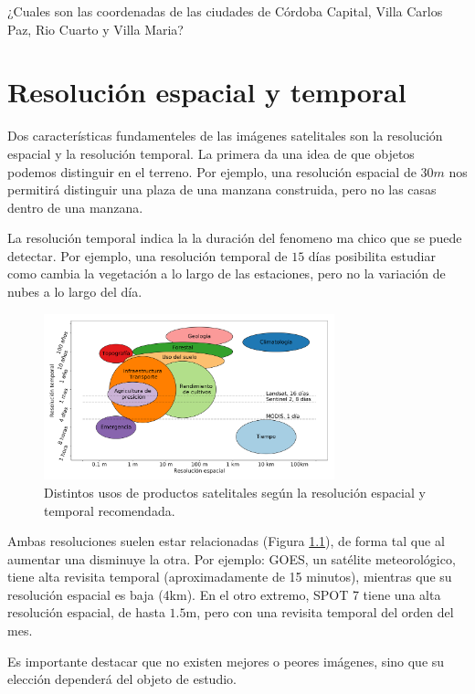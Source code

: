 \documentclass[a4paper,12pt]{book}
\begin{document}
\begin{que}
    ¿Cuales son las coordenadas de las ciudades de Córdoba Capital, Villa Carlos Paz, Rio Cuarto y Villa Maria?
\end{que}




\chapter{Resolución espacial y temporal}
Dos características fundamenteles de las imágenes satelitales son la resolución espacial y la resolución temporal. La primera da una idea de que objetos podemos distinguir en el terreno. Por ejemplo, una resolución espacial de $30m$ nos permitirá distinguir una plaza de una manzana construida, pero no las casas dentro de una manzana.

La resolución temporal indica la la duración del fenomeno ma chico que se puede detectar. Por ejemplo, una resolución temporal de $15$ días posibilita estudiar como cambia la vegetación a lo largo de las estaciones, pero no la variación de nubes a lo largo del día.

\begin{figure}[h!]
    \centering
    \includegraphics[width=0.75\textwidth]{fig:evst.png}
    \caption{Distintos usos de productos satelitales según la resolución espacial y temporal recomendada.}
    \label{fig:evst}
\end{figure}


Ambas resoluciones suelen estar relacionadas (Figura \ref{fig:evst}), de forma  tal que al aumentar una disminuye la otra. Por ejemplo: GOES, un satélite meteorológico, tiene alta revisita temporal (aproximadamente de 15 minutos), mientras que su resolución espacial es baja (4km). En el otro extremo, SPOT 7 tiene una alta resolución espacial, de hasta $1.5$m, pero con una revisita temporal del orden del mes.

Es importante destacar que no existen mejores o peores imágenes, sino que su elección dependerá del objeto de estudio.
\end{document}
